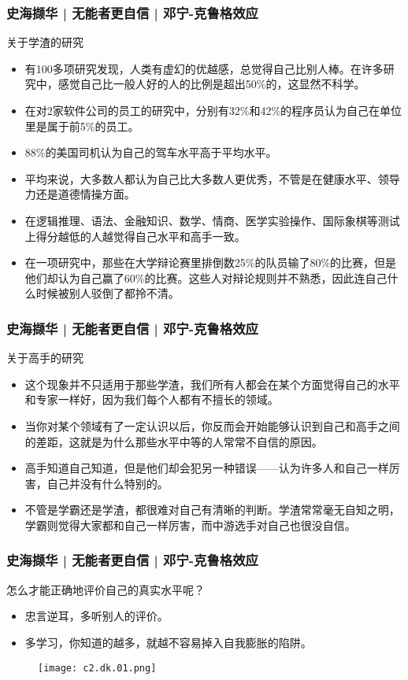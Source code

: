 \begin{frame}
  \frametitle{史海撷华 | 无能者更自信 | 邓宁-克鲁格效应}
  \begin{block}{关于学渣的研究}
    \begin{itemize}
      \item 有100多项研究发现，人类有虚幻的优越感，总觉得自己比别人棒。在许多研究中，感觉自己比一般人好的人的比例是超出50\%的，这显然不科学。
      \item 在对2家软件公司的员工的研究中，分别有32\%和42\%的程序员认为自己在单位里是属于前5\%的员工。
      \item 88\%的美国司机认为自己的驾车水平高于平均水平。
      \item 平均来说，大多数人都认为自己比大多数人更优秀，不管是在健康水平、领导力还是道德情操方面。
      \item 在逻辑推理、语法、金融知识、数学、情商、医学实验操作、国际象棋等测试上得分越低的人越觉得自己水平和高手一致。
      \item 在一项研究中，那些在大学辩论赛里排倒数25\%的队员输了80\%的比赛，但是他们却认为自己赢了60\%的比赛。这些人对辩论规则并不熟悉，因此连自己什么时候被别人驳倒了都拎不清。
    \end{itemize}
  \end{block}
\end{frame}

\begin{frame}
  \frametitle{史海撷华 | 无能者更自信 | 邓宁-克鲁格效应}
  \begin{block}{关于高手的研究}
    \begin{itemize}
      \item 这个现象并不只适用于那些学渣，我们所有人都会在某个方面觉得自己的水平和专家一样好，因为我们每个人都有不擅长的领域。
      \item 当你对某个领域有了一定认识以后，你反而会开始能够认识到自己和高手之间的差距，这就是为什么那些水平中等的人常常不自信的原因。
      \item 高手知道自己知道，但是他们却会犯另一种错误——认为许多人和自己一样厉害，自己并没有什么特别的。
      \item 不管是学霸还是学渣，都很难对自己有清晰的判断。\alert{学渣常常毫无自知之明，学霸则觉得大家都和自己一样厉害，而中游选手对自己也很没自信。}
    \end{itemize}
  \end{block}
\end{frame}

\begin{frame}
  \frametitle{史海撷华 | 无能者更自信 | 邓宁-克鲁格效应}
  \begin{block}{怎么才能正确地评价自己的真实水平呢？}
    \begin{itemize}
      \item 忠言逆耳，多听别人的评价。
      \item 多学习，你知道的越多，就越不容易掉入自我膨胀的陷阱。
    \end{itemize}
  \end{block}
  \begin{figure}
    \centering
    \texttt{[image: c2.dk.01.png]}
  \end{figure}
\end{frame}

